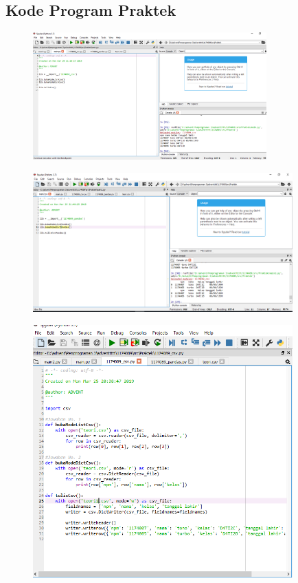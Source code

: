 

\subsection{Kode Program Praktek}
\begin{figure}[H]
	\includegraphics[width=9cm]{figures/4/1174089/Praktek/k1.png}
	\centering
\end{figure}
\begin{figure}[H]
	\includegraphics[width=10cm]{figures/4/1174089/Praktek/k2.png}
	\centering
\end{figure}
\begin{figure}[H]
	\includegraphics[width=10cm]{figures/4/1174089/Praktek/k3.png}
	\centering
\end{figure}
